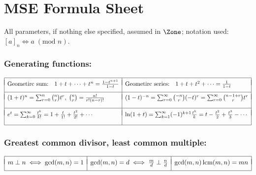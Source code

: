 \documentclass[a4paper]{article}
\begin{document}
\section*{MSE Formula Sheet}

All parameters, if nothing else specified, assumed in $\Zone$;
notation used: $[a]_n \iff a\; (\mbox{mod } n)$.

\vspace{-10pt}

\subsubsection*{Generating functions:} \vspace{-1.2em}%
\[
  \begin{array}[t]{|ll|ll|}
    \hline
    &&& \\[-9pt]
    \mbox{Geometirc sum:} & 1+t+\cdots+t^n = \frac{1-t^{n+1}}{1-t} &
    \mbox{Geometirc series:} & 1+t+t^2+\cdots = \frac{1}{1-t}
    \\[7pt]\hline
    &&& \\[-9pt]
    \multicolumn{2}{|l|}{(1+t)^n = \sum_{r=0}^{n} \binom nr t^r, \; \binom nr = \frac{n!}{r!(n-r)!}} &
    \multicolumn{2}{l|}{(1-t)^{-n} = \sum_{r=0}^{\infty} \binom {-n}r (-t)^r = \sum_{r=0}^{\infty}\binom {n-1+r}r t^r}
    \\[11pt]\hline
    &&& \\[-9pt]
    \multicolumn{2}{|l|}{e^t = \sum_{k=0}^{\infty} \frac{t^k}{k!} =  1 + \frac{t}{1!} + \frac{t^2}{2!} + \cdots}&
    \multicolumn{2}{l|}{\ln(1+t) = \sum_{k=1}^{\infty}(-1)^{k+1}\frac{t^k}{k} =  t - \frac{t^2}{2} + \frac{t^3}{3} - \cdots}
    \\[11pt]\hline

  \end{array}
\]%

\subsubsection*{Greatest common divisor, least common multiple:} \vspace{-1.2em}%
\[
  \begin{array}[t]{|*{3}{l|}}
    \hline
    && \\[-8pt]
    m\perp n \iff \gcd(m,n)=1 & \gcd(m,n) = d \iff \frac md\perp\frac nd & \gcd(m,n)\,\mbox{lcm}(m,n) = mn
 \\[6pt] \hline
  \end{array}
\]%
\end{document}
